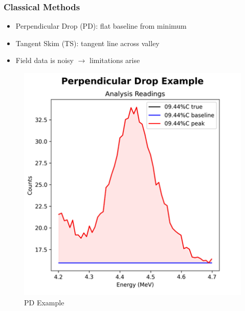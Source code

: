 \documentclass[xcolor=dvipsnames,envcountsect]{beamer}
\begin{document}
\begin{frame}
  \frametitle{Classical Methods}
  \begin{itemize}
    \item Perpendicular Drop (PD): flat baseline from minimum
    \item Tangent Skim (TS): tangent line across valley
    \item Field data is noisy $\rightarrow$ limitations arise
  \end{itemize}
  \begin{figure}
      \centering
      \begin{minipage}[b]{0.3\linewidth}
          \centering
          \includegraphics[width=\linewidth]{Figures/perpdropexample.png}
          \caption{PD Example}
          \label{fig:perpendiculardropexample}
      \end{minipage}
      \begin{minipage}[b]{0.3\linewidth}
          \centering

\end{minipage}
\end{figure}
\end{frame}
\end{document}
